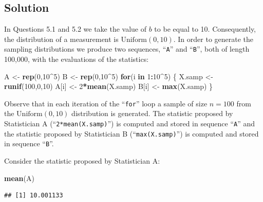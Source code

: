 \documentclass[]{krantz}
\makeatletter
\newenvironment{Shaded}{\begin{snugshade}}{\end{snugshade}}
\newcommand{\KeywordTok}[1]{\textcolor[rgb]{0.13,0.29,0.53}{\textbf{#1}}}
\newcommand{\DecValTok}[1]{\textcolor[rgb]{0.00,0.00,0.81}{#1}}
\newcommand{\StringTok}[1]{\textcolor[rgb]{0.31,0.60,0.02}{#1}}
\newcommand{\ControlFlowTok}[1]{\textcolor[rgb]{0.13,0.29,0.53}{\textbf{#1}}}
\newcommand{\OperatorTok}[1]{\textcolor[rgb]{0.81,0.36,0.00}{\textbf{#1}}}
\newcommand{\NormalTok}[1]{#1}
\newenvironment{kframe}{%
\medskip{}
\setlength{\fboxsep}{.8em}
 \def\at@end@of@kframe{}%
 \ifinner\ifhmode%
  \def\at@end@of@kframe{\end{minipage}}%
  \begin{minipage}{\columnwidth}%
 \fi\fi%
 \def\FrameCommand##1{\hskip\@totalleftmargin \hskip-\fboxsep
 \colorbox{shadecolor}{##1}\hskip-\fboxsep
     \hskip-\linewidth \hskip-\@totalleftmargin \hskip\columnwidth}%
 \MakeFramed {\advance\hsize-\width
   \@totalleftmargin\z@ \linewidth\hsize
   \@setminipage}}%
 {\par\unskip\endMakeFramed%
 \at@end@of@kframe}
\renewenvironment{Shaded}{\begin{kframe}}{\end{kframe}}
\theoremstyle{definition}
\theoremstyle{definition}
\theoremstyle{definition}
\theoremstyle{remark}
\makeatother
\begin{document}
\subsection*{Solution}\label{solution-4}


In Questions 5.1 and 5.2 we take the value of \(b\) to be equal to 10.
Consequently, the distribution of a measurement is
\(\mbox{Uniform}(0,10)\). In order to generate the sampling
distributions we produce two sequences, ``\texttt{A}'' and
``\texttt{B}'', both of length 100,000, with the evaluations of the
statistics:

\begin{Shaded}
\begin{Highlighting}[]
\NormalTok{A <-}\StringTok{ }\KeywordTok{rep}\NormalTok{(}\DecValTok{0}\NormalTok{,}\DecValTok{10}\OperatorTok{^}\DecValTok{5}\NormalTok{)}
\NormalTok{B <-}\StringTok{ }\KeywordTok{rep}\NormalTok{(}\DecValTok{0}\NormalTok{,}\DecValTok{10}\OperatorTok{^}\DecValTok{5}\NormalTok{)}
\ControlFlowTok{for}\NormalTok{(i }\ControlFlowTok{in} \DecValTok{1}\OperatorTok{:}\DecValTok{10}\OperatorTok{^}\DecValTok{5}\NormalTok{) \{}
\NormalTok{  X.samp <-}\StringTok{ }\KeywordTok{runif}\NormalTok{(}\DecValTok{100}\NormalTok{,}\DecValTok{0}\NormalTok{,}\DecValTok{10}\NormalTok{)}
\NormalTok{  A[i] <-}\StringTok{ }\DecValTok{2}\OperatorTok{*}\KeywordTok{mean}\NormalTok{(X.samp)}
\NormalTok{  B[i] <-}\StringTok{ }\KeywordTok{max}\NormalTok{(X.samp)}
\NormalTok{\}}
\end{Highlighting}
\end{Shaded}

Observe that in each iteration of the ``\texttt{for}'' loop a sample of
size \(n=100\) from the \(\mbox{Uniform}(0,10)\) distribution is
generated. The statistic proposed by Statistician A
(``\texttt{2*mean(X.samp)}'') is computed and stored in sequence
``\texttt{A}'' and the statistic proposed by Statistician B
(``\texttt{max(X.samp)}'') is computed and stored in sequence
``\texttt{B}''.

Consider the statistic proposed by Statistician A:

\begin{Shaded}
\begin{Highlighting}[]
\KeywordTok{mean}\NormalTok{(A)}
\end{Highlighting}
\end{Shaded}

\begin{verbatim}
## [1] 10.001133
\end{verbatim}
\end{document}
